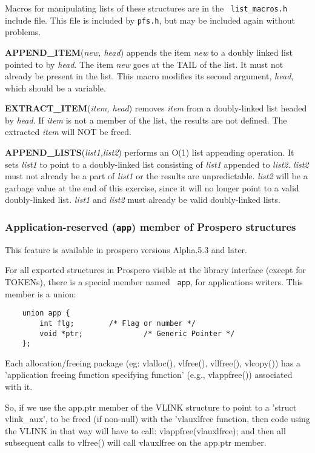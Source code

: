 Macros for manipulating lists of these structures are in the {\tt
list\_macros.h} include file.  This file is included by {\tt pfs.h}, but may be
included again without problems.

{\bf APPEND\_ITEM}({\it new, head}) appends the item {\it new} to a doubly linked
list pointed to by {\it head}.  The item {\it new} goes  at the TAIL
of the list.  It must not already be present in the list.  This macro
modifies its second argument, {\it head}, which should be a variable.

{\bf EXTRACT\_ITEM}({\it item, head}) removes {\it item} from a
doubly-linked list headed by {\it head}.  If {\it item} is not a
member of the list, the results are not defined.  The extracted {\it
item} will NOT be freed.

{\bf APPEND\_LISTS}({\it list1,list2}) performs an O(1) list appending
operation.  It sets {\it list1} to point to a doubly-linked list
consisting of {\it list1} appended to {\it list2}.  {\it list2} must
not already be a part of {\it list1} or the results are unpredictable.
{\it list2} will be a garbage value at the end of this exercise, since
it will no longer point to a valid doubly-linked list.  {\it list1}
and {\it list2} must already be valid doubly-linked lists.

\subsubsection{Application-reserved ({\tt app}) member of Prospero structures}

This feature is available in prospero versions Alpha.5.3 and later.

For all exported structures in Prospero visible at the library
interface (except for TOKENs), there is a special member named {\tt
app}, for applications writers.  This member is a union:

\begin{verbatim}
	union app {
		int flg;		/* Flag or number */
		void *ptr;              /* Generic Pointer */
	};
\end{verbatim}

Each allocation/freeing package (eg: vlalloc(), vlfree(), vllfree(),
vlcopy()) has a 'application freeing function specifying function'
(e.g., vlappfree()) associated with it.

So, if we use the app.ptr member of the VLINK structure to point to a
'struct vlink\_aux', to be freed (if non-null) with the 'vlauxlfree
function, then code using the VLINK in that way will have to call:
vlappfree(vlauxlfree); and then all subsequent calls to vlfree() will
call vlauxlfree on the app.ptr member.

